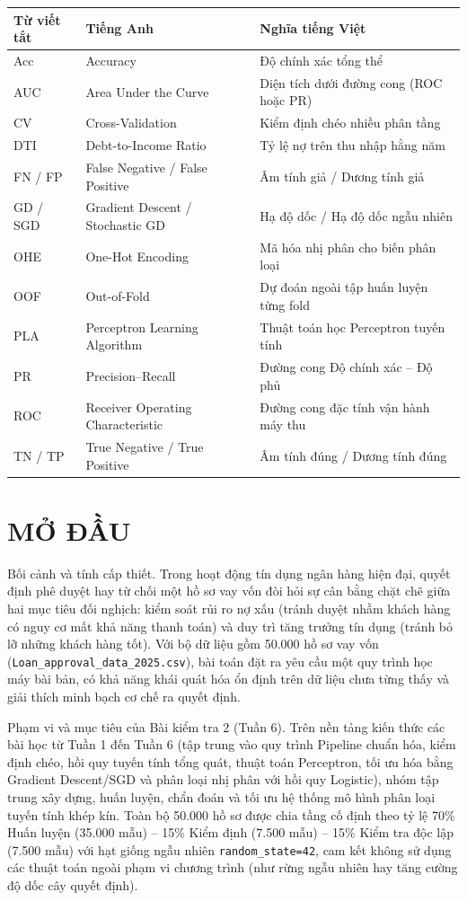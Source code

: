 \documentclass[12pt,a4paper,oneside]{report}
\newcommand{\unnumberedchapter}[1]{%
  \chapter*{#1}\phantomsection\addcontentsline{toc}{chapter}{#1}\markboth{#1}{}}
\begin{document}
\noindent
\begin{tabularx}{\textwidth}{@{}p{3.2cm}p{5.5cm}X@{}}
  \toprule
  \textbf{Từ viết tắt} & \textbf{Tiếng Anh} & \textbf{Nghĩa tiếng Việt} \\
  \midrule
  Acc & Accuracy & Độ chính xác tổng thể \\
  AUC & Area Under the Curve & Diện tích dưới đường cong (ROC hoặc PR) \\
  CV & Cross-Validation & Kiểm định chéo nhiều phân tầng \\
  DTI & Debt-to-Income Ratio & Tỷ lệ nợ trên thu nhập hằng năm \\
  FN / FP & False Negative / False Positive & Âm tính giả / Dương tính giả \\
  GD / SGD & Gradient Descent / Stochastic GD & Hạ độ dốc / Hạ độ dốc ngẫu nhiên \\
  OHE & One-Hot Encoding & Mã hóa nhị phân cho biến phân loại \\
  OOF & Out-of-Fold & Dự đoán ngoài tập huấn luyện từng fold \\
  PLA & Perceptron Learning Algorithm & Thuật toán học Perceptron tuyến tính \\
  PR & Precision--Recall & Đường cong Độ chính xác -- Độ phủ \\
  ROC & Receiver Operating Characteristic & Đường cong đặc tính vận hành máy thu \\
  TN / TP & True Negative / True Positive & Âm tính đúng / Dương tính đúng \\
  \bottomrule
\end{tabularx}

\unnumberedchapter{MỞ ĐẦU}

Bối cảnh và tính cấp thiết. Trong hoạt động tín dụng ngân hàng hiện đại, quyết định phê duyệt hay từ chối một hồ sơ vay vốn đòi hỏi sự cân bằng chặt chẽ giữa hai mục tiêu đối nghịch: kiểm soát rủi ro nợ xấu (tránh duyệt nhầm khách hàng có nguy cơ mất khả năng thanh toán) và duy trì tăng trưởng tín dụng (tránh bỏ lỡ những khách hàng tốt). Với bộ dữ liệu gồm 50.000 hồ sơ vay vốn (\texttt{Loan\_approval\_data\_2025.csv}), bài toán đặt ra yêu cầu một quy trình học máy bài bản, có khả năng khái quát hóa ổn định trên dữ liệu chưa từng thấy và giải thích minh bạch cơ chế ra quyết định.

Phạm vi và mục tiêu của Bài kiểm tra 2 (Tuần 6). Trên nền tảng kiến thức các bài học từ Tuần 1 đến Tuần 6 (tập trung vào quy trình Pipeline chuẩn hóa, kiểm định chéo, hồi quy tuyến tính tổng quát, thuật toán Perceptron, tối ưu hóa bằng Gradient Descent/SGD và phân loại nhị phân với hồi quy Logistic), nhóm tập trung xây dựng, huấn luyện, chẩn đoán và tối ưu hệ thống mô hình phân loại tuyến tính khép kín. Toàn bộ 50.000 hồ sơ được chia tầng cố định theo tỷ lệ 70\% Huấn luyện (35.000 mẫu) -- 15\% Kiểm định (7.500 mẫu) -- 15\% Kiểm tra độc lập (7.500 mẫu) với hạt giống ngẫu nhiên \texttt{random\_state=42}, cam kết không sử dụng các thuật toán ngoài phạm vi chương trình (như rừng ngẫu nhiên hay tăng cường độ dốc cây quyết định).
\end{document}
